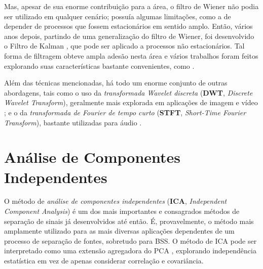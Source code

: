 
Mas, apesar de sua enorme contribuição para a área, o filtro de Wiener não podia ser utilizado em qualquer cenário; possuía algumas limitações, como a de depender de processos que fossem estacionários em sentido amplo. Então, vários anos depois, partindo de uma generalização do filtro de Wiener, foi desenvolvido o Filtro de Kalman \citep{kalman1960new}, que pode ser aplicado a processos não estacionários. Tal forma de filtragem obteve ampla adesão nesta área e vários trabalhos foram feitos explorando suas características bastante convenientes, como \citep{701367, 1169756, 91144}.

Além das técnicas mencionadas, há todo um enorme conjunto de outras abordagens, tais como o uso da \textit{transformada Wavelet discreta} (\textbf{DWT}, \textit{Discrete Wavelet Transform}), geralmente mais explorada em aplicações de imagem e vídeo \citep{119727, doi:10.1175/1520-0477, 336245}; e o da \textit{transformada de Fourier de tempo curto} (\textbf{STFT}, \textit{Short-Time Fourier Transform}), bastante utilizadas para áudio \citep{622558, 1164910, 4156182, 1164162, 466662}.





\section{Análise de Componentes Independentes}
\label{sec:bss_ica}

O método de \textit{análise de componentes independentes} (\textbf{ICA}, \textit{Independent Component Analysis}) é um dos mais importantes e consagrados métodos de separação de sinais já desenvolvidos até então. É, provavelmente, o método mais amplamente utilizado para as mais diversas aplicações dependentes de um processo de separação de fontes, sobretudo para BSS. O método de ICA pode ser interpretado como uma extensão agregadora do PCA \citep{COMON1994287}, explorando independência estatística em vez de apenas considerar correlação e covariância.



